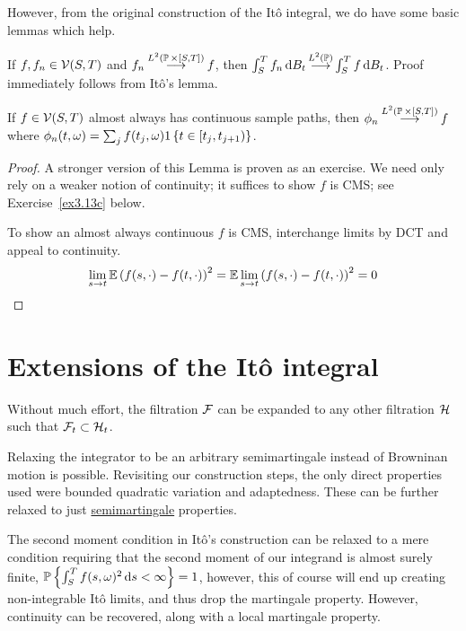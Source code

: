 \documentclass{article}
\begin{document}
However, from the original construction of the It\^{o} integral, we do have some basic lemmas which help.

\begin{lemma}
  \label{lemma:validelem}
  If \(f,f_n\in\mathcal{V}(S, T)\) and \(f_n\mathbin{\overset{ L^2(\operatorname{\mathbb{P}}\times[S,T]) }{\longrightarrow}} f\), then \(\int_S^T f_n\mathop{\mathrm{d} B_t }\mathbin{\overset{ L^2(\operatorname{\mathbb{P}}) }{\longrightarrow}} \int_S^Tf\mathop{\mathrm{d} B_t }\). Proof immediately follows from It\^{o}'s lemma.
\end{lemma}


\begin{lemma}
  \label{lemma:continuous}
  If \(f\in\mathcal{V}(S, T)\) almost always has continuous sample paths, then \(\phi_n\mathbin{\overset{ L^2(\operatorname{\mathbb{P}}\times[S,T]) }{\longrightarrow}} f\) where \(\phi_n(t, \omega)=\sum_jf(t_j,\omega)1\left\{{t\in[t_j,t_{j+1})}\right\}\).
\end{lemma}
\begin{proof}
  A stronger version of this Lemma is proven as an exercise. We need only rely on a weaker notion of continuity; it suffices to show \(f\) is CMS; see Exercise~\ref{ex3.13c} below.

  To show an almost always continuous \(f\) is CMS, interchange limits by DCT and appeal to continuity.
  \[
    \lim_{s\rightarrow t}\operatorname{\mathbb{E}}\left({f(s,\cdot)-f(t, \cdot)}\right)^2= \operatorname{\mathbb{E}}\lim_{s\rightarrow t}\left({f(s,\cdot)-f(t, \cdot)}\right)^2=0
    \]
  \end{proof}

\section{Extensions of the It\^{o} integral}

Without much effort, the filtration \(\mathcal{F}\) can be expanded to any other filtration \(\mathcal{H}\) such that \(\mathcal{F}_t\subset\mathcal{H}_t\).

Relaxing the integrator to be an arbitrary semimartingale instead of Browninan motion is possible. Revisiting our construction steps, the only direct properties used were bounded quadratic variation and adaptedness. These can be further relaxed to just \href{https://en.wikipedia.org/wiki/Semimartingale}{semimartingale} properties.

The second moment condition in It\^{o}'s construction can be relaxed to a mere condition requiring that the second moment of our integrand is almost surely finite, \(\operatorname{\mathbb{P}}\left\{{\int_S^Tf(s,\omega)^2\mathop{\mathrm{d} s }<\infty}\right\}=1\), however, this of course will end up creating non-integrable It\^{o} limits, and thus drop the martingale property. However, continuity can be recovered, along with a local martingale property.
\end{document}

